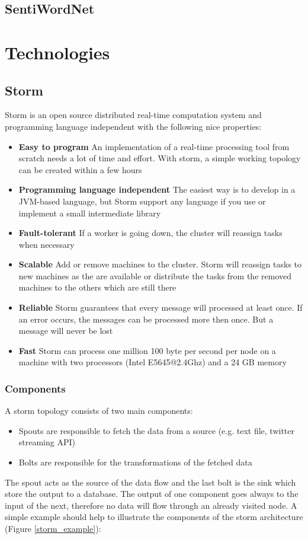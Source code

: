 \documentclass[a4paper]{article}
\begin{document}
\subsection{SentiWordNet}

\section{Technologies}

\subsection{Storm}
Storm is an open source distributed real-time computation system and programming language independent with the following nice properties:
\begin{itemize}
	\item \textbf{Easy to program} An implementation of a real-time processing tool from scratch needs a lot of time and effort. With storm, a simple working topology can be created within a few hours 
	\item \textbf{Programming language independent} The easiest way is to develop in a JVM-based language, but Storm support any language if you use or implement a small intermediate library 
	\item \textbf{Fault-tolerant} If a worker is going down, the cluster will reassign tasks when necessary 
	\item \textbf{Scalable} Add or remove machines to the cluster. Storm will reassign tasks to new machines as the are available or distribute the tasks from the removed machines to the others which are still there 
	\item \textbf{Reliable} Storm guarantees that every message will processed at least once. If an error occurs, the messages can be processed more then once. But a message will never be lost 
	\item \textbf{Fast} Storm can process one million 100 byte per second per node on a machine with two processors (Intel E5645@2.4Ghz) and a 24 GB memory 
\end{itemize}
\subsubsection{Components}
A storm topology consists of two main components:
\begin{itemize}
	\item Spouts are responsible to fetch the data from a source (e.g. text file, twitter streaming API)
	\item Bolts are responsible for the transformations of the fetched data
\end{itemize}
The spout acts as the source of the data flow and the last bolt is the sink which store the output to a database. The output of one component goes always to the input of the next, therefore no data will flow through an already visited node. A simple example should help to illustrate the components of the storm architecture (Figure \ref{storm_example}):\\
\end{document}

